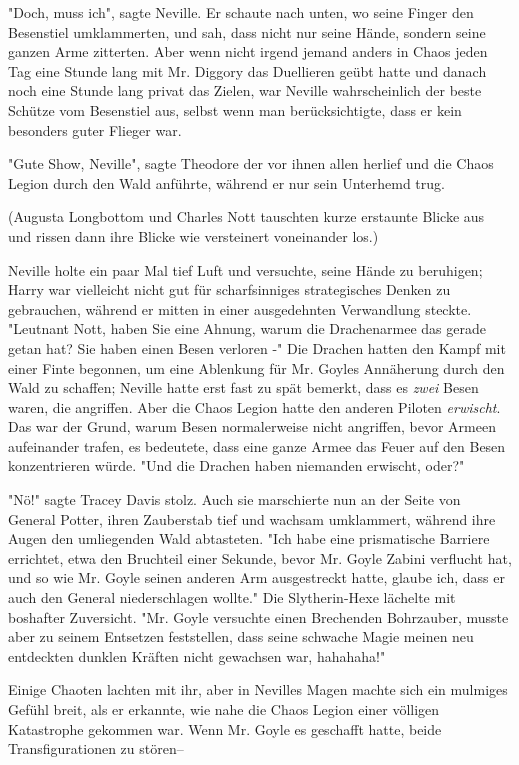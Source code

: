 {"Doch, muss ich", sagte Neville. Er schaute nach unten, wo seine Finger den Besenstiel umklammerten, und sah, dass nicht nur seine Hände, sondern seine ganzen Arme zitterten. Aber wenn nicht irgend jemand anders in Chaos jeden Tag eine Stunde lang mit Mr. Diggory das Duellieren geübt hatte und danach noch eine Stunde lang privat das Zielen, war Neville wahrscheinlich der beste Schütze vom Besenstiel aus, selbst wenn man berücksichtigte, dass er kein besonders guter Flieger war.

"Gute Show, Neville", sagte Theodore der vor ihnen allen herlief und die Chaos Legion durch den Wald anführte, während er nur sein Unterhemd trug.

(Augusta Longbottom und Charles Nott tauschten kurze erstaunte Blicke aus und rissen dann ihre Blicke wie versteinert voneinander los.)

Neville holte ein paar Mal tief Luft und versuchte, seine Hände zu beruhigen; Harry war vielleicht nicht gut für scharfsinniges strategisches Denken zu gebrauchen, während er mitten in einer ausgedehnten Verwandlung steckte. "Leutnant Nott, haben Sie eine Ahnung, warum die Drachenarmee das gerade getan hat? Sie haben einen Besen verloren -" Die Drachen hatten den Kampf mit einer Finte begonnen, um eine Ablenkung für Mr. Goyles Annäherung durch den Wald zu schaffen; Neville hatte erst fast zu spät bemerkt, dass es \emph{zwei} Besen waren, die angriffen. Aber die Chaos Legion hatte den anderen Piloten \emph{erwischt}. Das war der Grund, warum Besen normalerweise nicht angriffen, bevor Armeen aufeinander trafen, es bedeutete, dass eine ganze Armee das Feuer auf den Besen konzentrieren würde. "Und die Drachen haben niemanden erwischt, oder?"

"Nö!" sagte Tracey Davis stolz. Auch sie marschierte nun an der Seite von General Potter, ihren Zauberstab tief und wachsam umklammert, während ihre Augen den umliegenden Wald abtasteten. "Ich habe eine prismatische Barriere errichtet, etwa den Bruchteil einer Sekunde, bevor Mr. Goyle Zabini verflucht hat, und so wie Mr. Goyle seinen anderen Arm ausgestreckt hatte, glaube ich, dass er auch den General niederschlagen wollte." Die Slytherin-Hexe lächelte mit boshafter Zuversicht. "Mr. Goyle versuchte einen Brechenden Bohrzauber, musste aber zu seinem Entsetzen feststellen, dass seine schwache Magie meinen neu entdeckten dunklen Kräften nicht gewachsen war, hahahaha!"

Einige Chaoten lachten mit ihr, aber in Nevilles Magen machte sich ein mulmiges Gefühl breit, als er erkannte, wie nahe die Chaos Legion einer völligen Katastrophe gekommen war. Wenn Mr. Goyle es geschafft hatte, beide Transfigurationen zu stören--

}
